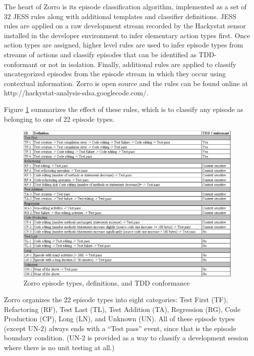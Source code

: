 \documentclass[smallextended]{svjour3}     %
\begin{document}
The heart of Zorro is its episode classification algorithm, implemented as a set of 32 JESS rules along with additional templates and classifier definitions.  JESS rules are applied on a raw development stream recorded by the Hackystat sensor installed in the developer environment to infer elementary action types first. Once action types are assigned, higher level rules are used to infer episode types from streams of actions and classify episodes that can be identified as TDD-conformant or not in isolation. Finally, additional rules are applied to classify uncategorized episodes from the episode stream in which they occur using contextual information.  Zorro is open source and the rules can be found online at http://hackystat-analysis-sdsa.googlecode.com/.

Figure \ref{fig:Categories} summarizes the effect of these rules, 
which is to classify any episode as belonging to one of 22 episode types. 

\begin{figure}[th]
  \center
  \includegraphics[width=1.0\textwidth]{episode-classification.eps}
  \caption{Zorro episode types, definitions, and TDD conformance}
  \label{fig:Categories}
\end{figure} 


Zorro organizes the 22 episode types into eight categories: Test First
(TF), Refactoring (RF), Test Last (TL), Test Addition (TA), Regression
(RG), Code Production (CP), Long (LN), and Unknown (UN).  All of these
episode types (except UN-2) always ends with a ``Test pass'' event, since that
is the episode boundary condition.  (UN-2 is provided as a way to classify
a development session where there is no unit testing at all.) 
\end{document}
